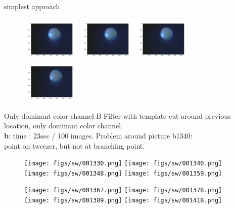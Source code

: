 \documentclass{beamer}              %
\begin{document}
\begin{frame}{simplest approach}
\begin{figure}
    \includegraphics[width=0.25\textwidth]{figs/simplest/000271.png}
    \includegraphics[width=0.25\textwidth]{figs/simplest/000272.png}
    \includegraphics[width=0.25\textwidth]{figs/simplest/000273.png}
    \includegraphics[width=0.25\textwidth]{figs/simplest/000274.png}
\end{figure}
\end{frame}

\begin{frame}{Only dominant color channel B}
Filter with template cut around previous location, only dominant color channel. \\
\textbf{b}: time : 23sec / 100 images. Problem around picture b1340:\\
point on tweezer, but not at branching point.
\begin{figure}
    \centering
    \texttt{[image: figs/sw/001330.png]}
    \texttt{[image: figs/sw/001340.png]}
    \texttt{[image: figs/sw/001348.png]}
    \texttt{[image: figs/sw/001359.png]}
    
    \texttt{[image: figs/sw/001367.png]}
    \texttt{[image: figs/sw/001378.png]}
    \texttt{[image: figs/sw/001389.png]}
    \texttt{[image: figs/sw/001418.png]}
\end{figure}
\end{frame}
\end{document}
